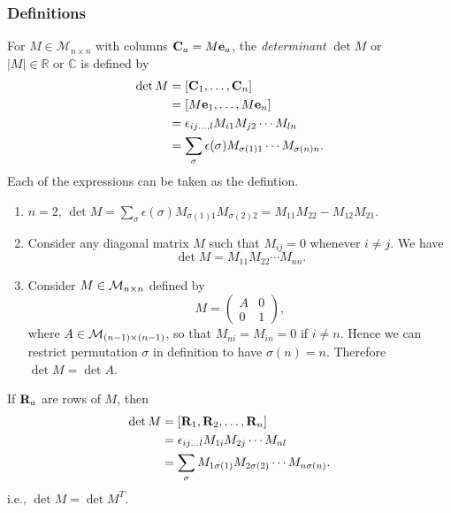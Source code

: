 \documentclass[10pt]{article}
\begin{document}
    \subsubsection{Definitions}
    \begin{definition}
        For $ M\in \mathcal{M}_{n\times n} $ with columns $ {\bf C}_a=M{\bf e}_a $, the \textit{determinant} $ \det M $ or $ |M|\in \mathbb{R} \text{ or }\mathbb{C}  $ is defined by 
    \[
        \begin{aligned}
            \det M&= [{\bf C}_1,\dots,{\bf C}_n]\\
             &=[M{\bf e}_1,\dots,M{\bf e}_n]\\
             &= \epsilon_{ij\dots,l}M_{i1}M_{j2}\cdots M_{ln}\\
             &= \sum_{\sigma}\epsilon(\sigma)M_{\sigma(1)1}\cdots M_{\sigma(n)n}.
        \end{aligned}
    \]
    Each of the expressions can be taken as the defintion.
    \end{definition}
    \begin{example}
        \begin{enumerate}
            \item $n=2$, $ \det M= \sum_{\sigma}\epsilon(\sigma)M_{\sigma(1)1}M_{\sigma(2)2}=M_{11}M_{22}-M_{12}M_{21} $.
            \item Consider any diagonal matrix $M$ such that $ M_{ij}=0 $ whenever $ i\neq j $. We have 
            \[
                \det M = M_{11}M_{22}\cdots M_{nn}
            .\]
            \item Consider $ M\in {\mathcal{M}}_{n\times n} $ defined by 
            \[
                M= \begin{pmatrix}
                    A&0\\
                    0&1
                \end{pmatrix}
            ,\]
            where $A\in {\mathcal{M}}_{(n-1) \times (n-1)}$, so that $ M_{ni}=M_{in}=0 $ if $i\neq n$. Hence we can restrict permutation $ \sigma $ in definition to have $ \sigma(n)=n $. Therefore $ \det M=\det A $.
        \end{enumerate}
    \end{example}
    \begin{proposition}
        If $ {\bf R}_a $ are rows of $M$, then 
        \[
            \begin{aligned}
                \det M&=[{\bf R}_1,{\bf R}_2,\dots,{\bf R}_n]\\
                &= \epsilon_{ij\dots l}M_{1i}M_{2j}\cdots M_{nl}\\
                &= \sum_{\sigma}M_{1\sigma(1)}M_{2\sigma(2)}\cdots M_{n\sigma(n)}.
            \end{aligned}
        \]
        i.e., $ \det M = \det M^T $.
    \end{proposition}
\end{document}
